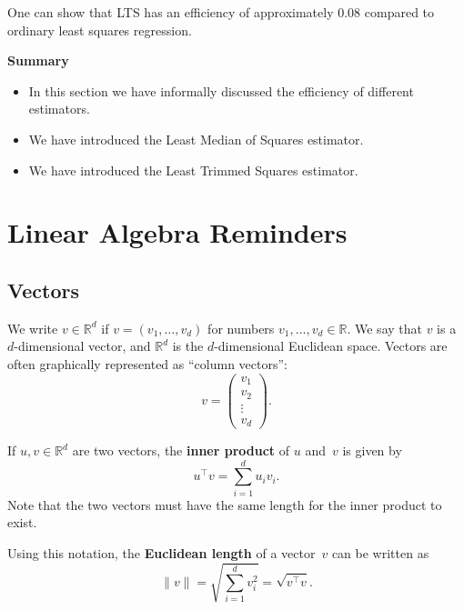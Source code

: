 \documentclass[
  a4paper,
]{article}
\providecommand{\tightlist}{%
  \setlength{\itemsep}{0pt}\setlength{\parskip}{0pt}}
\theoremstyle{definition}
\theoremstyle{definition}
\theoremstyle{definition}
\theoremstyle{definition}
\theoremstyle{remark}
\begin{document}
One can show that LTS has an efficiency of approximately \(0.08\)
compared to ordinary least squares regression.

\textbf{Summary}

\begin{itemize}
\tightlist
\item
  In this section we have informally discussed the efficiency of different estimators.
\item
  We have introduced the Least Median of Squares estimator.
\item
  We have introduced the Least Trimmed Squares estimator.
\end{itemize}

\clearpage

\hypertarget{appendix-appendices}{%
\appendix}


\hypertarget{Sx1-matrices}{%
\section{Linear Algebra Reminders}\label{Sx1-matrices}}

\hypertarget{vectors}{%
\subsection{Vectors}\label{vectors}}

We write \(v \in \mathbb{R}^d\) if \(v = (v_1, \ldots, v_d)\) for numbers
\(v_1, \ldots, v_d \in\mathbb{R}\). We say that \(v\) is a \(d\)-dimensional vector,
and \(\mathbb{R}^d\) is the \(d\)-dimensional Euclidean space. Vectors are
often graphically represented as ``column vectors'':
\begin{equation*}
  v = \begin{pmatrix}
      v_1 \\ v_2 \\ \vdots \\ v_d
  \end{pmatrix}.
\end{equation*}

If \(u,v\in\mathbb{R}^d\) are two vectors, the \textbf{inner product} of \(u\) and~\(v\)
is given by
\begin{equation}
  u^\top v
  = \sum_{i=1}^d u_i v_i.  \label{eq:inner-product}
\end{equation}
Note that the two vectors must have the same length for the inner product
to exist.

Using this notation, the \textbf{Euclidean length} of a vector~\(v\)
can be written as
\begin{equation*}
  \|v\|
  = \sqrt{\sum_{i=1}^d v_i^2}
  = \sqrt{v^\top v}.
\end{equation*}
\end{document}
